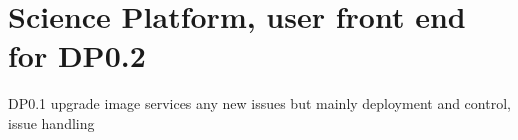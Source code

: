 \section{Science Platform, user front end for DP0.2 } \label{sec:frontend}

DP0.1 upgrade image services any new issues  but mainly deployment and control, issue handling


